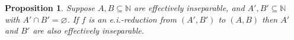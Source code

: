 \documentclass[a4paper,10pt]{amsart}
\renewcommand{\emptyset}{\varnothing}
\newtheorem{proposition}[theorem]{Proposition}
\theoremstyle{definition}
\newcommand{\N}{\mathbb N}
\begin{document}
\begin{proposition}\label{prop-reduction}
Suppose $A,B \subseteq \N$ are effectively inseparable, and 
 $A',B' \subseteq \N$ with $A' \cap B' = \emptyset$.  
If $f$ is an e.i.-reduction from $(A',B')$ to $(A,B)$ 
then $A'$ and $B'$ are also effectively inseparable.
\end{proposition}
\end{document}
